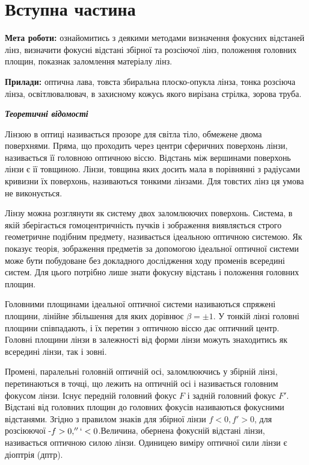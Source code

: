 \section{Вступна частина}
\setlength{\parindent}{4em}
\indent \textbf{Мета роботи:} ознайомитись з деякими методами визначення фокусних відстаней лінз, визначити фокусні відстані збірної та розсіючої лінз, положення головних площин, показнак заломлення матеріалу лінз. \par
\textbf{Прилади:} оптична лава, товста збиральна плоско-опукла лінза, тонка розсіюча лінза, освітлювалювач, в захисному кожусь якого вирізана стрілка, зорова труба.
\begin{center}
\textbf{\emph{Теоретичні відомості}}
\end{center}
\indent Лінзою в оптиці називається прозоре для світла тіло, обмежене двома поверхнями.
Пряма, що проходить через центри сферичних поверхонь лінзи, називається її
головною оптичною віссю. Відстань між вершинами поверхонь лінзи є її товщиною. Лінзи,
товщина яких досить мала в порівнянні з радіусами кривизни їх поверхонь, називаються тонкими
лінзами. Для товстих лінз ця умова не виконується.\par
Лінзу можна розглянути як систему двох заломлюючих поверхонь. Система, в якій
зберігається гомоцентричність пучків і зображення виявляється строго геометричне подібним
предмету, називається ідеальною оптичною системою. Як показує теорія, зображення предметів
за допомогою ідеальної оптичної системи може бути побудоване без докладного дослідження
ходу променів всередині систем. Для цього потрібно лише знати фокусну відстань і положення
головних площин.\par
Головними площинами ідеальної оптичної системи називаються спряжені площини,
лінійне збільшення для яких дорівнює $\beta = \pm 1$. У тонкій лінзі головні площини співпадають, і їх
перетин з оптичною віссю дає оптичний центр. Головні площини лінзи в залежності від форми
лінзи можуть знаходитись як всередині лінзи, так і зовні.\par
Промені, паралельні головній оптичній осі, заломлюючись у збірній лінзі,
перетинаються в точці, що лежить на оптичній осі і називається головним фокусом лінзи. Існує
передній головний фокус $F$ і задній головний фокус $F'$. Відстані від головних площин до
головних фокусів називаються фокусними відстанями. Згідно з правилом знаків для збірної лінзи $f<0,f'>0$, для розсіюючої -$f>0,''`<0$.Величина, обернена фокусній відстані лінзи,
називається оптичною силою лінзи. Одиницею виміру оптичної сили лінзи є діоптрія (дптр).

